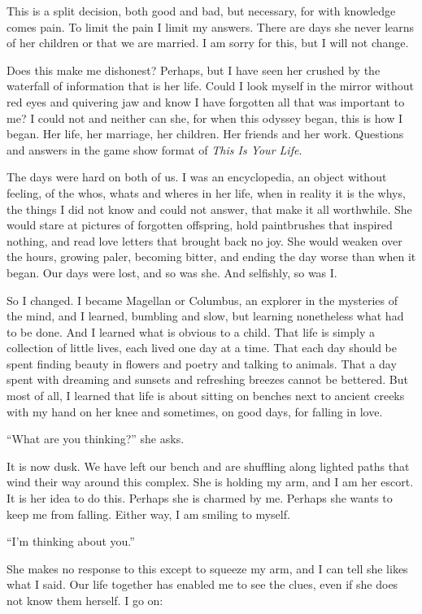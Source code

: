 \documentclass[10pt, twoside, openright]{book}
\begin{document}
This is a split decision, both good and bad, but necessary, for with
knowledge comes pain. To limit the pain I limit my answers. There are
days she never learns of her children or that we are married. I am sorry
for this, but I will not change.

Does this make me dishonest? Perhaps, but I have seen her crushed by the
waterfall of information that is her life. Could I look myself in the
mirror without red eyes and quivering jaw and know I have forgotten all
that was important to me? I could not and neither can she, for when this
odyssey began, this is how I began. Her life, her marriage, her
children. Her friends and her work. Questions and answers in the game
show format of \emph{This Is Your Life}.

The days were hard on both of us. I was an encyclopedia, an object
without feeling, of the whos, whats and wheres in her life, when in
reality it is the whys, the things I did not know and could not answer,
that make it all worthwhile. She would stare at pictures of forgotten
offspring, hold paintbrushes that inspired nothing, and read love
letters that brought back no joy. She would weaken over the hours,
growing paler, becoming bitter, and ending the day worse than when it
began. Our days were lost, and so was she. And selfishly, so was I.

So I changed. I became Magellan or Columbus, an explorer in the
mysteries of the mind, and I learned, bumbling and slow, but learning
nonetheless what had to be done. And I learned what is obvious to a
child. That life is simply a collection of little lives, each lived one
day at a time. That each day should be spent finding beauty in flowers
and poetry and talking to animals. That a day spent with dreaming and
sunsets and refreshing breezes cannot be bettered. But most of all, I
learned that life is about sitting on benches next to ancient creeks
with my hand on her knee and sometimes, on good days, for falling in
love.


``What are you thinking?'' she asks.


It is now dusk. We have left our bench and are shuffling along lighted
paths that wind their way around this complex. She is holding my arm,
and I am her escort. It is her idea to do this. Perhaps she is charmed
by me. Perhaps she wants to keep me from falling. Either way, I am
smiling to myself.


``I'm thinking about you.''


She makes no response to this except to squeeze my arm, and I can tell
she likes what I said. Our life together has enabled me to see the
clues, even if she does not know them herself. I go on:
\end{document}
